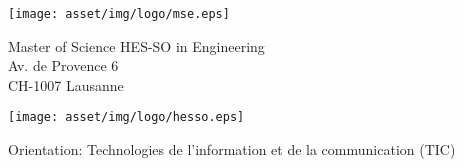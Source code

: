 \begin{titlepage}
    \begin{flushleft}

        \begin{minipage}[c][1.5cm][t]{0.4\textwidth}
            \begin{flushleft}
                \vspace{0.1cm}
                \texttt{[image: asset/img/logo/mse.eps]}
            \end{flushleft}
            {
            \footnotesize
            Master of Science HES-SO in Engineering \\
            Av. de Provence 6 \\
            CH-1007 Lausanne
            }
        \end{minipage}
        \hfill
        \begin{minipage}[c][1.5cm][t]{0.4\textwidth}
            \begin{flushright}
                \texttt{[image: asset/img/logo/hesso.eps]}
            \end{flushright}
        \end{minipage}
        
        \makeatletter

        \vspace{1cm}
        
        
        \vspace{0.5cm}

        \begin{flushleft}

            {\Large \@university}

            \vspace{0.2cm}

            {\large Orientation: Technologies de l'information et de la communication (TIC)}
            
            \vspace{1cm}

            {\huge \bfseries \@title \par}
            
            \vspace{0.7cm}


\end{flushleft}
\end{flushleft}
\end{titlepage}
